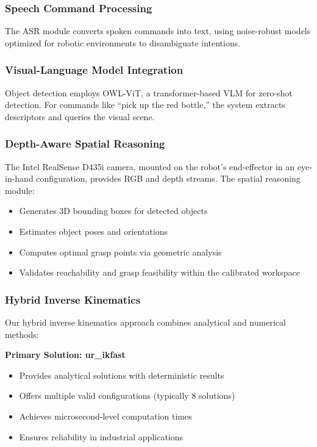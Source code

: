 \documentclass[conference]{IEEEtran}
\begin{document}
\subsubsection{Speech Command Processing}
The ASR module converts spoken commands into text, using noise-robust models optimized for robotic environments to disambiguate intentions.

\subsubsection{Visual-Language Model Integration}
Object detection employs OWL-ViT, a transformer-based VLM for zero-shot detection. For commands like ``pick up the red bottle,'' the system extracts descriptors and queries the visual scene.

\subsubsection{Depth-Aware Spatial Reasoning}
The Intel RealSense D435i camera, mounted on the robot's end-effector in an eye-in-hand configuration, provides RGB and depth streams. The spatial reasoning module:
\begin{itemize}
    \item Generates 3D bounding boxes for detected objects
    \item Estimates object poses and orientations
    \item Computes optimal grasp points via geometric analysis
    \item Validates reachability and grasp feasibility within the calibrated workspace
\end{itemize}

\subsubsection{Hybrid Inverse Kinematics}
Our hybrid inverse kinematics approach combines analytical and numerical methods:

\textbf{Primary Solution: ur\_ikfast}
\begin{itemize}
    \item Provides analytical solutions with deterministic results
    \item Offers multiple valid configurations (typically 8 solutions)
    \item Achieves microsecond-level computation times
    \item Ensures reliability in industrial applications
\end{itemize}
\end{document}
